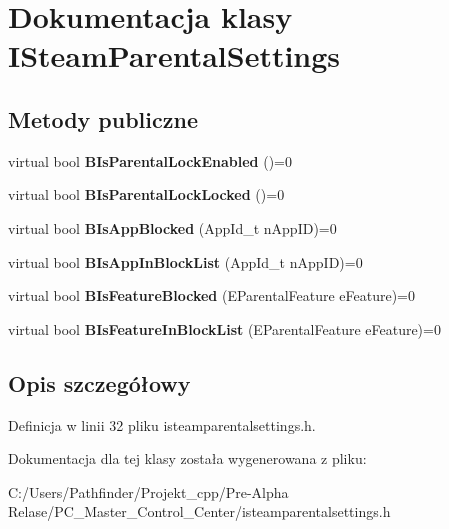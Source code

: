 \hypertarget{class_i_steam_parental_settings}{}\section{Dokumentacja klasy I\+Steam\+Parental\+Settings}
\label{class_i_steam_parental_settings}
\subsection*{Metody publiczne}
\begin{DoxyCompactItemize}
\item 
\mbox{\label{class_i_steam_parental_settings_abb304f06b62ed721c1fd7fa3b749b8d9}} 
virtual bool {\bfseries B\+Is\+Parental\+Lock\+Enabled} ()=0
\item 
\mbox{\label{class_i_steam_parental_settings_a49fa17602b236b56e54e86798d3b004a}} 
virtual bool {\bfseries B\+Is\+Parental\+Lock\+Locked} ()=0
\item 
\mbox{\label{class_i_steam_parental_settings_aa9b41b0d451da477fb3514ca561a0fa1}} 
virtual bool {\bfseries B\+Is\+App\+Blocked} (App\+Id\+\_\+t n\+App\+ID)=0
\item 
\mbox{\label{class_i_steam_parental_settings_a2b86717c847821e71275b773770d1e49}} 
virtual bool {\bfseries B\+Is\+App\+In\+Block\+List} (App\+Id\+\_\+t n\+App\+ID)=0
\item 
\mbox{\label{class_i_steam_parental_settings_a67a9f895852c3ae605f14a8965e356ca}} 
virtual bool {\bfseries B\+Is\+Feature\+Blocked} (E\+Parental\+Feature e\+Feature)=0
\item 
\mbox{\label{class_i_steam_parental_settings_adc5431357cad56cf5981f83dbe82d96d}} 
virtual bool {\bfseries B\+Is\+Feature\+In\+Block\+List} (E\+Parental\+Feature e\+Feature)=0
\end{DoxyCompactItemize}


\subsection{Opis szczegółowy}


Definicja w linii 32 pliku isteamparentalsettings.\+h.



Dokumentacja dla tej klasy została wygenerowana z pliku\+:\begin{DoxyCompactItemize}
\item 
C\+:/\+Users/\+Pathfinder/\+Projekt\+\_\+cpp/\+Pre-\/\+Alpha Relase/\+P\+C\+\_\+\+Master\+\_\+\+Control\+\_\+\+Center/isteamparentalsettings.\+h\end{DoxyCompactItemize}
